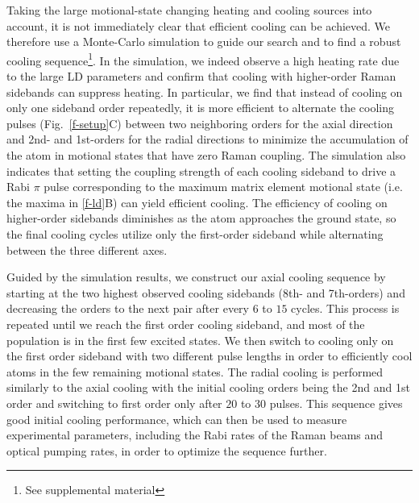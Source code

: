 \documentclass[aps,prl,twocolumn,groupedaddress]{revtex4-1}
\begin{document}
Taking the large motional-state changing heating and cooling sources into account,
it is not immediately clear that efficient cooling can be achieved.
We therefore use a Monte-Carlo simulation to guide our search and
to find a robust cooling sequence\footnote{See supplemental material}.
In the simulation, we indeed observe a high heating rate due to the large LD parameters
and confirm that cooling with higher-order Raman sidebands can suppress heating.
In particular, we find that instead of cooling on only one sideband order repeatedly,
it is more efficient to alternate the cooling pulses (Fig.~\ref{f-setup}C) between two
neighboring orders for the axial direction and 2nd- and 1st-orders for the radial directions
to minimize the accumulation of the atom in motional states that have zero Raman coupling.
The simulation also indicates that setting the coupling strength of each cooling sideband
to drive a Rabi $\pi$ pulse corresponding to the maximum matrix element motional state
(i.e. the maxima in \ref{f-ld}B) can yield efficient cooling.
The efficiency of cooling on higher-order sidebands diminishes
as the atom approaches the ground state, so the final cooling cycles utilize only the first-order sideband while alternating between the three different axes.

Guided by the simulation results,
we construct our axial cooling sequence by starting at the two highest
observed cooling sidebands (8th- and 7th-orders)
and decreasing the orders to the next pair after every $6$ to $15$ cycles.
This process is repeated until we reach the first order cooling sideband, and most of the
population is in the first few excited states. We then switch to cooling only on the
first order sideband with two different pulse lengths in order to efficiently cool atoms in the
few remaining motional states.
The radial cooling is performed similarly to the axial cooling with the initial cooling orders being
the 2nd and 1st order and switching to first order only after $20$ to $30$ pulses.
This sequence gives good initial cooling performance, which can then be used to measure experimental
parameters, including the Rabi rates of the Raman beams and optical pumping rates,
in order to optimize the sequence further.
\end{document}
